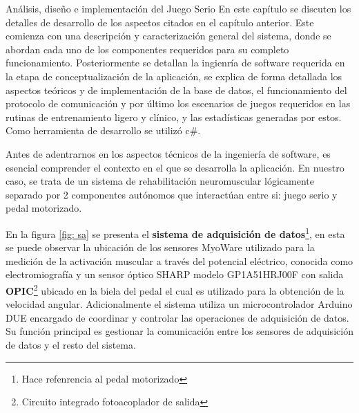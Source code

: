 \begin{thesischapter}{2} {Análisis, diseño e implementación del Juego Serio}
    En este capítulo se discuten los detalles de desarrollo de los aspectos citados en el capítulo anterior. Este comienza con una descripción y caracterización general del sistema, donde se  abordan cada uno de los componentes requeridos para su completo funcionamiento. Posteriormente se detallan la ingienría de software requerida en la etapa de conceptualización de la aplicación, se explica de forma 
    detallada los aspectos teóricos y de implementación de la base de datos, el funcionamiento del protocolo de comunicación y por último los escenarios de juegos requeridos en las rutinas de entrenamiento ligero y clínico, y las estadísticas generadas por estos. Como herramienta de desarrollo se utilizó c\#.

    Antes de adentrarnos en los aspectos técnicos de la ingeniería de software, es esencial comprender el contexto en 
    el que se desarrolla la aplicación. En nuestro caso, se trata de un sistema de rehabilitación neuromuscular lógicamente 
    separado por 2 componentes autónomos que interactúan entre si: juego serio y pedal motorizado. 

    \vspace{10pt} %
    En la figura \ref{fig: sa} se presenta el \textbf{sistema de adquisición de datos}\footnote{Hace refenrencia al pedal motorizado}, en esta se puede observar la ubicación de los sensores MyoWare  utilizado para la medición de la activación muscular a través del potencial eléctrico, conocida como electromiografía y un sensor óptico SHARP modelo GP1A51HRJ00F con salida  \textbf{OPIC}\footnote{Circuito integrado fotoacoplador de salida} ubicado en la biela del pedal el cual es utilizado para la obtención de la velocidad angular. Adicionalmente el sistema utiliza un microcontrolador Arduino DUE encargado de coordinar y controlar las operaciones de adquisición de datos. Su función principal es gestionar la comunicación entre los sensores de adquisición de datos y el resto del sistema.


\end{thesischapter}
